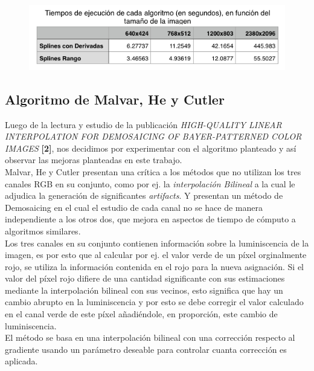 \documentclass[a4paper]{article}
\begin{document}
\begin{figure}[h!]
    \begin{center}
    \includegraphics[scale=0.70]{imagenes/tiempos/derrangt.png}
    \label{tiempos1}
  \end{center}
\end{figure}

\pagebreak
\subsection{Algoritmo de Malvar, He y Cutler}

Luego de la lectura y estudio de la publicaci\'on \textit{HIGH-QUALITY LINEAR INTERPOLATION
FOR DEMOSAICING OF BAYER-PATTERNED COLOR IMAGES} \textbf{[2]}, nos decidimos por experimentar con el algoritmo planteado y as\'i observar las mejoras planteadas en este trabajo.\\

Malvar, He y Cutler presentan una cr\'itica a los m\'etodos que no utilizan los tres canales RGB en su conjunto, como por ej. la \emph{interpolaci\'on Bilineal} a la cual le adjudica la generaci\'on de significantes \textit{artifacts}. Y presentan un m\'etodo de Demosaicing en el cual el estudio de cada canal no se hace de manera independiente a los otros dos, que mejora en aspectos de tiempo de c\'omputo a algoritmos similares.\\

Los tres canales en su conjunto contienen informaci\'on sobre la luminiscencia de la imagen, es por esto que al calcular por ej. el valor verde de un p\'ixel orginalmente rojo, se utiliza la informaci\'on contenida en el rojo para la nueva asignaci\'on. Si el valor del p\'ixel rojo difiere de una cantidad significante con sus estimaciones mediante la interpolaci\'on bilineal con sus vecinos, esto significa que hay un cambio abrupto en la luminiscencia y por esto se debe corregir el valor calculado en el canal verde de este p\'ixel a\~nadi\'endole, en proporci\'on, este cambio de luminiscencia.\\

El m\'etodo se basa en una interpolaci\'on bilineal con una correcci\'on respecto al gradiente usando un par\'ametro deseable para controlar cuanta correcci\'on es aplicada.\\
\end{document}
